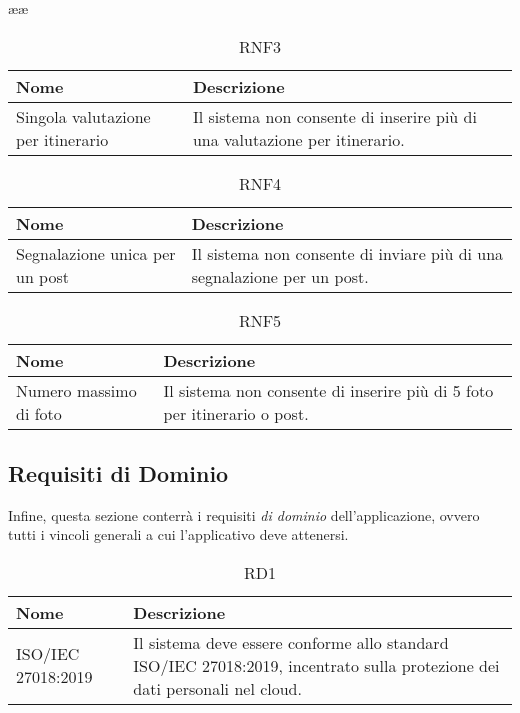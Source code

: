 ææ\documentclass{natourDoc}
\begin{document}
	\begin{table}[H]
		\centering
		\begin{tabular}{ |p{5cm}|p{10.3cm}| } 
			\hline
			\rowcolor{PineGreen!70}
			\textbf{Nome} & \textbf{Descrizione} \\
			\hline
			Singola valutazione per itinerario & Il sistema non consente di inserire più di una valutazione
			per itinerario. \\
			\hline
		\end{tabular}
		\caption{RNF3}
		\label{table:23}
	\end{table}

	\begin{table}[H]
		\centering
		\begin{tabular}{ |p{5cm}|p{10.3cm}| } 
			\hline
			\rowcolor{PineGreen!70}
			\textbf{Nome} & \textbf{Descrizione} \\
			\hline
			Segnalazione unica per un post & Il sistema non consente di inviare più di una segnalazione per un post. \\
			\hline
		\end{tabular}
		\caption{RNF4}
		\label{table:24}
	\end{table}

	\begin{table}[H]
		\centering
		\begin{tabular}{ |p{5cm}|p{10.3cm}| } 
			\hline
			\rowcolor{PineGreen!70}
			\textbf{Nome} & \textbf{Descrizione} \\
			\hline
			Numero massimo di foto & Il sistema non consente di inserire più di 5 foto per itinerario o post. \\
			\hline
		\end{tabular}
		\caption{RNF5}
		\label{table:25}
	\end{table}

	\newpage

	\subsection{Requisiti di Dominio}
	Infine, questa sezione conterrà i requisiti \textit{di dominio} dell'applicazione, ovvero tutti i vincoli generali a cui l'applicativo
	deve attenersi. \\

	\begin{table}[H]
		\centering
		\begin{tabular}{ |p{5cm}|p{10.3cm}| }
			\hline
			\rowcolor{PineGreen!70}
			\textbf{Nome} & \textbf{Descrizione} \\
			\hline
			ISO/IEC 27018:2019 & Il sistema deve essere conforme allo standard ISO/IEC 27018:2019, 
			incentrato sulla protezione dei dati personali nel cloud. \\
			\hline
		\end{tabular}
		\caption{RD1}
		\label{table:26}
	\end{table}
\end{document}
